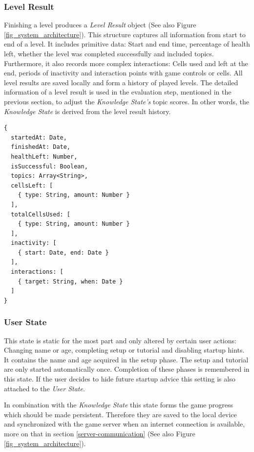 \subsubsection{Level Result} \label{level-result}
Finishing a level produces a \textit{Level Result} object (See also Figure \ref{fig_system_architecture}). This structure captures all information from start to end of a level. It includes primitive data: Start and end time, percentage of health left, whether the level was completed successfully and included topics. Furthermore, it also records more complex interactions: Cells used and left at the end, periods of inactivity and interaction points with game controls or cells. All level results are saved locally and form a history of played levels. The detailed information of a level result is used in the evaluation step, mentioned in the previous section, to adjust the \textit{Knowledge State's} topic scores. In other words, the \textit{Knowledge State} is derived from the level result history. 

\begin{lstlisting}[caption={Pseudo TypeScript\protect\footnotemark code for Level Result}]
{
  startedAt: Date,
  finishedAt: Date,
  healthLeft: Number,
  isSuccessful: Boolean,
  topics: Array<String>,
  cellsLeft: [
    { type: String, amount: Number }
  ],
  totalCellsUsed: [
    { type: String, amount: Number }
  ],
  inactivity: [
    { start: Date, end: Date }
  ],
  interactions: [
    { target: String, when: Date }
  ]
}
\end{lstlisting}

\subsubsection{User State} \label{user-state}
This state is static for the most part and only altered by certain user actions: Changing name or age, completing setup or tutorial and disabling startup hints. It contains the name and age acquired in the setup phase. The setup and tutorial are only started automatically once. Completion of these phases is remembered in this state. If the user decides to hide future startup advice this setting is also attached to the \textit{User State}.

In combination with the \textit{Knowledge State} this state forms the game progress which should be made persistent. Therefore they are saved to the local device and synchronized with the game server when an internet connection is available, more on that in section \ref{server-communication} (See also Figure \ref{fig_system_architecture}).

